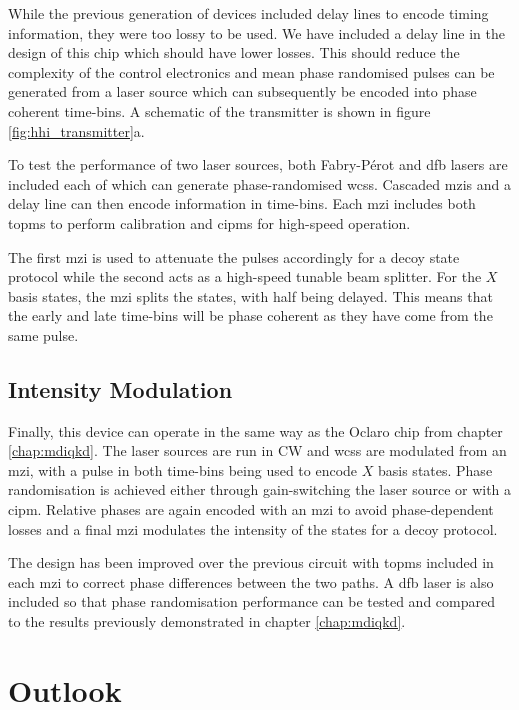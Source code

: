 While the previous generation of devices included delay lines to encode timing information, they were too lossy to be used. We have included a delay line in the design of this chip which should have lower losses. This should reduce the complexity of the control electronics and mean phase randomised pulses can be generated from a laser source which can subsequently be encoded into phase coherent time-bins. A schematic of the transmitter is shown in figure \ref{fig:hhi_transmitter}a.

To test the performance of two laser sources, both Fabry-P\'{e}rot and \ac{dfb} lasers are included each of which can generate phase-randomised \acp{wcs}. Cascaded \acp{mzi} and a delay line can then encode information in time-bins. Each \ac{mzi} includes both \acp{topm} to perform calibration and \acp{cipm} for high-speed operation. 

The first \ac{mzi} is used to attenuate the pulses accordingly for a decoy state protocol while the second acts as a high-speed tunable beam splitter. For the $X$ basis states, the \ac{mzi} splits the states, with half being delayed. This means that the early and late time-bins will be phase coherent as they have come from the same pulse. 

\subsection{Intensity Modulation}

Finally, this device can operate in the same way as the Oclaro chip from chapter \ref{chap:mdiqkd}. The laser sources are run in \ac{CW} and \acp{wcs} are modulated from an \ac{mzi}, with a pulse in both time-bins being used to encode $X$ basis states. Phase randomisation is achieved either through gain-switching the laser source or with a \ac{cipm}. Relative phases are again encoded with an \ac{mzi} to avoid phase-dependent losses and a final \ac{mzi} modulates the intensity of the states for a decoy protocol. 

The design has been improved over the previous circuit with \acp{topm} included in each \ac{mzi} to correct phase differences between the two paths. A \ac{dfb} laser is also included so that phase randomisation performance can be tested and compared to the results previously demonstrated in chapter \ref{chap:mdiqkd}.

\section{Outlook}

